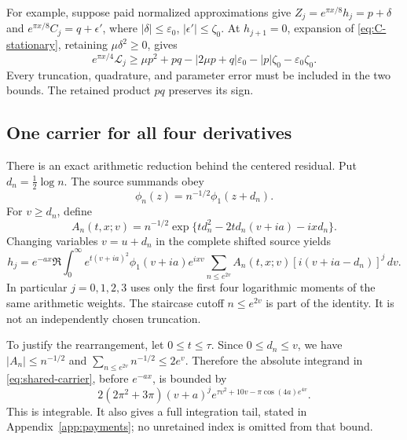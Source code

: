 \documentclass[11pt]{article}
\numberwithin{equation}{section}
\theoremstyle{definition}
\theoremstyle{remark}
\newcommand{\dd}{\,d}
\newcommand{\Lag}{\mathcal L}
\begin{document}
For example, suppose paid normalized approximations give
$Z_j=e^{\pi x/8}h_j=p+\delta$ and
$e^{\pi x/8}C_j=q+\epsilon'$, where
$|\delta|\le\varepsilon_0$, $|\epsilon'|\le\zeta_0$.
At $h_{j+1}=0$, expansion of \eqref{eq:C-stationary}, retaining
$\mu\delta^2\ge0$, gives
\begin{equation}
 e^{\pi x/4}\Lag_j\ge\mu p^2+pq
 -|2\mu p+q|\varepsilon_0-|p|\zeta_0-\varepsilon_0\zeta_0.
 \label{eq:paid-signed-residual}
\end{equation}
Every truncation, quadrature, and parameter error must be included in
the two bounds. The retained product $pq$ preserves its sign.

\subsection{One carrier for all four derivatives}
There is an exact arithmetic reduction behind the centered residual.
Put $d_n=\tfrac12\log n$. The source summands obey
\begin{equation}
 \phi_n(z)=n^{-1/2}\phi_1(z+d_n).
 \label{eq:theta-translation}
\end{equation}
For $v\ge d_n$, define
\begin{equation}
 A_n(t,x;v)=n^{-1/2}
       \exp\{td_n^2-2td_n(v+ia)-ixd_n\}.
 \label{eq:An}
\end{equation}
Changing variables $v=u+d_n$ in the complete shifted source yields
\begin{equation}
 h_j=e^{-ax}\Re\int_0^\infty
 e^{t(v+ia)^2}\phi_1(v+ia)e^{ixv}
 \sum_{n\le e^{2v}}A_n(t,x;v)[i(v+ia-d_n)]^j\dd v.
 \label{eq:shared-carrier}
\end{equation}
In particular $j=0,1,2,3$ uses only the first four logarithmic moments
of the same arithmetic weights. The staircase cutoff $n\le e^{2v}$
is part of the identity. It is not an independently chosen truncation.

To justify the rearrangement, let $0\le t\le\tau$. Since
$0\le d_n\le v$, we have $|A_n|\le n^{-1/2}$ and
$\sum_{n\le e^{2v}}n^{-1/2}\le2e^v$. Therefore the absolute integrand
in \eqref{eq:shared-carrier}, before $e^{-ax}$, is bounded by
\begin{equation}
 2(2\pi^2+3\pi)(v+a)^j
           e^{\tau v^2+10v-\pi\cos(4a)e^{4v}}.
 \label{eq:shared-majorant}
\end{equation}
This is integrable. It also gives a full integration tail, stated in
Appendix~\ref{app:payments}; no unretained index is omitted from that
bound.
\end{document}
